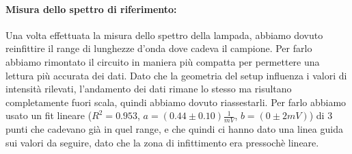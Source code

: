 \documentclass{article}
\begin{document}
\paragraph{Misura dello spettro di riferimento:}
Una volta effettuata la misura dello spettro della lampada, abbiamo dovuto reinfittire il range di lunghezze d'onda dove cadeva il campione. Per farlo abbiamo rimontato il circuito in maniera più compatta per permettere una lettura più accurata dei dati. Dato che la geometria del setup influenza i valori di intensità rilevati, l'andamento dei dati rimane lo stesso ma risultano completamente fuori scala, quindi abbiamo dovuto riassestarli. Per farlo abbiamo usato un fit lineare ($R^2=0.953$, $a=(0.44\pm0.10)\frac{1}{mV}$, $b= (0\pm2 mV)$) di 3 punti che cadevano già in quel range, e che quindi ci hanno dato una linea guida sui valori da seguire, dato che la zona di infittimento era pressochè lineare.
\end{document}
